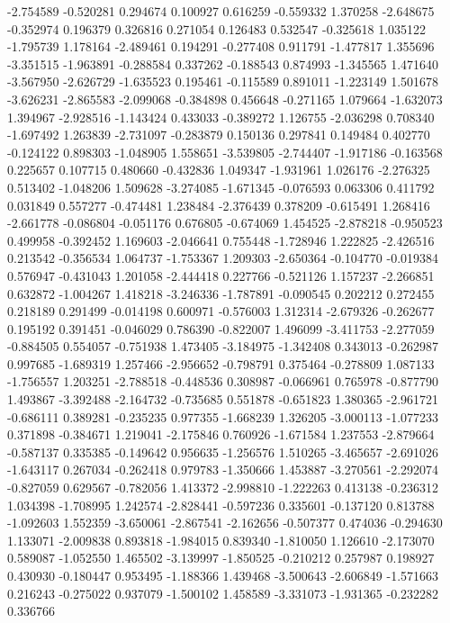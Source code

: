 -2.754589
-0.520281
0.294674
0.100927
0.616259
-0.559332
1.370258
-2.648675
-0.352974
0.196379
0.326816
0.271054
0.126483
0.532547
-0.325618
1.035122
-1.795739
1.178164
-2.489461
0.194291
-0.277408
0.911791
-1.477817
1.355696
-3.351515
-1.963891
-0.288584
0.337262
-0.188543
0.874993
-1.345565
1.471640
-3.567950
-2.626729
-1.635523
0.195461
-0.115589
0.891011
-1.223149
1.501678
-3.626231
-2.865583
-2.099068
-0.384898
0.456648
-0.271165
1.079664
-1.632073
1.394967
-2.928516
-1.143424
0.433033
-0.389272
1.126755
-2.036298
0.708340
-1.697492
1.263839
-2.731097
-0.283879
0.150136
0.297841
0.149484
0.402770
-0.124122
0.898303
-1.048905
1.558651
-3.539805
-2.744407
-1.917186
-0.163568
0.225657
0.107715
0.480660
-0.432836
1.049347
-1.931961
1.026176
-2.276325
0.513402
-1.048206
1.509628
-3.274085
-1.671345
-0.076593
0.063306
0.411792
0.031849
0.557277
-0.474481
1.238484
-2.376439
0.378209
-0.615491
1.268416
-2.661778
-0.086804
-0.051176
0.676805
-0.674069
1.454525
-2.878218
-0.950523
0.499958
-0.392452
1.169603
-2.046641
0.755448
-1.728946
1.222825
-2.426516
0.213542
-0.356534
1.064737
-1.753367
1.209303
-2.650364
-0.104770
-0.019384
0.576947
-0.431043
1.201058
-2.444418
0.227766
-0.521126
1.157237
-2.266851
0.632872
-1.004267
1.418218
-3.246336
-1.787891
-0.090545
0.202212
0.272455
0.218189
0.291499
-0.014198
0.600971
-0.576003
1.312314
-2.679326
-0.262677
0.195192
0.391451
-0.046029
0.786390
-0.822007
1.496099
-3.411753
-2.277059
-0.884505
0.554057
-0.751938
1.473405
-3.184975
-1.342408
0.343013
-0.262987
0.997685
-1.689319
1.257466
-2.956652
-0.798791
0.375464
-0.278809
1.087133
-1.756557
1.203251
-2.788518
-0.448536
0.308987
-0.066961
0.765978
-0.877790
1.493867
-3.392488
-2.164732
-0.735685
0.551878
-0.651823
1.380365
-2.961721
-0.686111
0.389281
-0.235235
0.977355
-1.668239
1.326205
-3.000113
-1.077233
0.371898
-0.384671
1.219041
-2.175846
0.760926
-1.671584
1.237553
-2.879664
-0.587137
0.335385
-0.149642
0.956635
-1.256576
1.510265
-3.465657
-2.691026
-1.643117
0.267034
-0.262418
0.979783
-1.350666
1.453887
-3.270561
-2.292074
-0.827059
0.629567
-0.782056
1.413372
-2.998810
-1.222263
0.413138
-0.236312
1.034398
-1.708995
1.242574
-2.828441
-0.597236
0.335601
-0.137120
0.813788
-1.092603
1.552359
-3.650061
-2.867541
-2.162656
-0.507377
0.474036
-0.294630
1.133071
-2.009838
0.893818
-1.984015
0.839340
-1.810050
1.126610
-2.173070
0.589087
-1.052550
1.465502
-3.139997
-1.850525
-0.210212
0.257987
0.198927
0.430930
-0.180447
0.953495
-1.188366
1.439468
-3.500643
-2.606849
-1.571663
0.216243
-0.275022
0.937079
-1.500102
1.458589
-3.331073
-1.931365
-0.232282
0.336766
